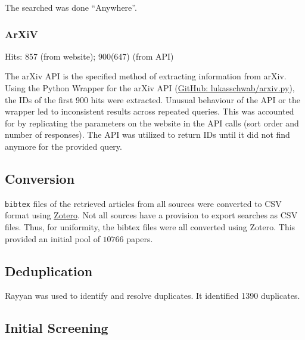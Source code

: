 \documentclass[a4paper,colorinlistoftodos]{article}
\begin{document}
The searched was done ``Anywhere''.

\subsubsection{ArXiV}
\label{subsubsec:arxiv}

Hits: 857 (from website); 900(647) (from API)

The arXiv API is the specified method of extracting information from
arXiv. Using the Python Wrapper for the arXiv API
(\href{https://github.com/lukasschwab/arxiv.py}{GitHub:
  lukasschwab/arxiv.py}), the IDs of the first 900 hits were
extracted. Unusual behaviour of the API or the wrapper led to inconsistent
results across repeated queries. This was accounted for by replicating the
parameters on the website in the API calls (sort order and number of
responses). The API was utilized to return IDs until it did not find anymore
for the provided query.

\subsection{Conversion}
\label{subsec:bib-to-csv}

\verb|bibtex| files of the retrieved articles from all sources were converted
to CSV format using \href{https://www.zotero.org}{Zotero}. Not all sources
have a provision to export searches as CSV files. Thus, for uniformity, the
bibtex files were all converted using Zotero. This provided an initial pool of
$10766$ papers.



\subsection{Deduplication}
\label{subsec:deduplication}

Rayyan was used to identify and resolve duplicates. It identified 1390
duplicates.

\subsection{Initial Screening}
\label{subsec:initial-screening}
\end{document}
